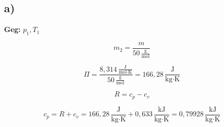 

\subsection*{a)}

\textbf{Geg:} $p_1, T_1$

\[
m_2 = \frac{m}{50 \, \frac{\text{g}}{\text{mol}}}
\]

\[
\Pi = \frac{8,314 \, \frac{\text{J}}{\text{mol} \cdot \text{K}}}{50 \, \frac{\text{g}}{\text{mol}}} = 166,28 \, \frac{\text{J}}{\text{kg} \cdot \text{K}}
\]

\[
R = c_p - c_v
\]

\[
c_p = R + c_v = 166,28 \, \frac{\text{J}}{\text{kg} \cdot \text{K}} + 0,633 \, \frac{\text{kJ}}{\text{kg} \cdot \text{K}} = 0,79928 \, \frac{\text{kJ}}{\text{kg} \cdot \text{K}}
\]